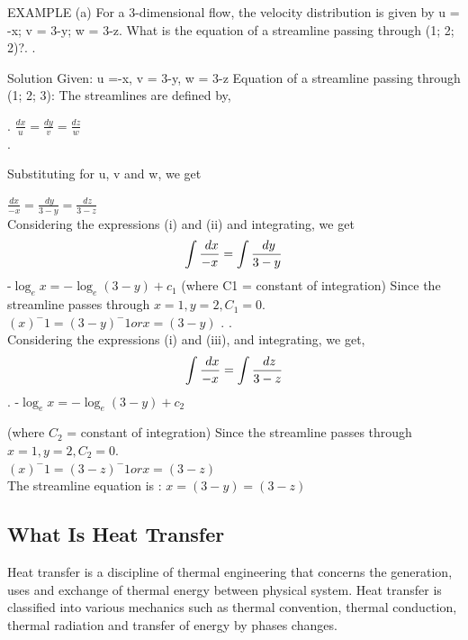 \documentclass[a4paper, 12pt]{report}
\begin{document}
EXAMPLE
(a) For a 3-dimensional flow, the velocity distribution is given by u =
-x; v = 3-y; w = 3-z. What is the equation of a streamline
passing through (1; 2; 2)?.
.

Solution
Given: u =-x, v = 3-y, w = 3-z
Equation of a streamline passing through (1; 2; 3):
The streamlines are defined by,

.
 $\displaystyle  \frac{dx}{u} =  \frac{dy}{v} =\frac{ dz}{w}$\\.

Substituting for u, v and w, we get

$\displaystyle  \frac{dx}{-x} = \frac{\ dy}{3-y} =\frac{\ dz}{3-z}$\\

Considering the expressions (i) and (ii) and integrating, we get
\begin{equation}
	\int  \frac{\ dx}{-x} =  \int \frac{\ dy}{3-y} \\
\end{equation}
	-$\log_e x = -\log_e (3-y) + c_1$
	(where C1 = constant of integration)	
Since the streamline passes through $x=1, y=2, C_1 =0$.\\
$(x)^-1 = (3-y)^-1  or x = (3 - y)$
.
.\\
Considering the expressions (i) and (iii), and integrating, we get,\\

\begin{equation}
	\int  \frac{\ dx}{-x} =  \int \frac{\ dz}{3-z} \\	
\end{equation}.
	-$\log_e x = -\log_e (3-y) + c_2$

(where $C_2$ = constant of integration)
Since the streamline passes through $x=1, y=2, C_2 =0$.\\
$(x)^-1 = (3-z)^-1  or x = (3 - z)$
\\
The streamline equation is :
$x = (3-y) = (3 -z)$



  

\subsection{What Is Heat Transfer}
Heat transfer is a discipline of thermal engineering that concerns the generation, uses and exchange of thermal energy between physical system. Heat transfer is classified into various mechanics such as thermal convention, thermal conduction, thermal radiation and transfer of energy by phases changes.
\end{document}
